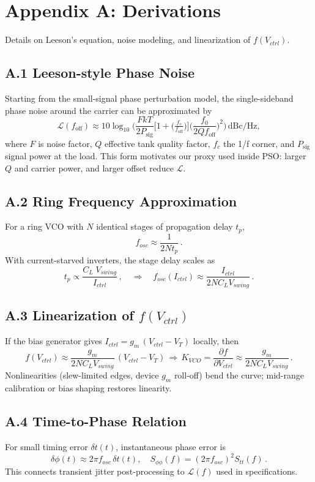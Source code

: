 \chapter{Appendix A: Derivations}
Details on Leeson's equation, noise modeling, and linearization of \(f(V_{ctrl})\).

\section*{A.1 Leeson-style Phase Noise}
Starting from the small-signal phase perturbation model, the single-sideband phase noise around the carrier can be approximated by
\[
  \mathcal{L}(f_\text{off}) \approx 10\log_{10} \Bigg( \frac{F k T}{2 P_{\text{sig}}} \Big[1+\big(\tfrac{f_c}{f_\text{off}}\big)\Big] \Big(\frac{f_0}{2 Q f_\text{off}}\Big)^2 \Bigg) \,\text{dBc/Hz},
\]
where \(F\) is noise factor, \(Q\) effective tank quality factor, \(f_c\) the 1/f corner, and \(P_{\text{sig}}\) signal power at the load. This form motivates our proxy used inside PSO: larger \(Q\) and carrier power, and larger offset reduce \(\mathcal{L}\).

\section*{A.2 Ring Frequency Approximation}
For a ring VCO with \(N\) identical stages of propagation delay \(t_p\),
\[
  f_{osc} \approx \frac{1}{2 N t_p}\,.
\]
With current-starved inverters, the stage delay scales as
\[
  t_p \propto \frac{C_L \; V_{swing}}{I_{ctrl}}\,,\quad \Rightarrow \quad f_{osc}(I_{ctrl}) \approx \frac{I_{ctrl}}{2 N C_L V_{swing}}\,.
\]

\section*{A.3 Linearization of \(f(V_{ctrl})\)}
If the bias generator gives \(I_{ctrl} = g_m \,(V_{ctrl} - V_T)\) locally, then
\[
  f(V_{ctrl}) \approx \frac{g_m}{2 N C_L V_{swing}}\,(V_{ctrl}-V_T)\,\Rightarrow\, K_{VCO} = \frac{\partial f}{\partial V_{ctrl}} \approx \frac{g_m}{2 N C_L V_{swing}}\,.
\]
Nonlinearities (slew-limited edges, device \(g_m\) roll-off) bend the curve; mid-range calibration or bias shaping restores linearity.

\section*{A.4 Time-to-Phase Relation}
For small timing error \(\delta t(t)\), instantaneous phase error is
\[
  \delta\phi(t) \approx 2\pi f_{osc}\, \delta t(t),\quad S_{\phi\phi}(f) = (2\pi f_{osc})^2 S_{tt}(f)\,.
\]
This connects transient jitter post-processing to \(\mathcal{L}(f)\) used in specifications.

